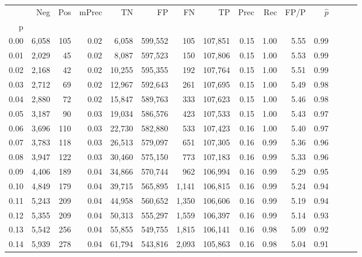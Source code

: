 \begin{tabular}{rrrrrrrrrrrrrrr}
\toprule
{} &     Neg &    Pos & mPrec &       TN &       FP &       FN &       TP &  Prec &   Rec &  FP/P & $\hat{p}$ \\
p    &         &        &       &          &          &          &          &       &       &       &           \\
\midrule
0.00 &   6,058 &    105 &  0.02 &    6,058 &  599,552 &      105 &  107,851 &  0.15 &  1.00 &  5.55 &      0.99 \\
0.01 &   2,029 &     45 &  0.02 &    8,087 &  597,523 &      150 &  107,806 &  0.15 &  1.00 &  5.53 &      0.99 \\
0.02 &   2,168 &     42 &  0.02 &   10,255 &  595,355 &      192 &  107,764 &  0.15 &  1.00 &  5.51 &      0.99 \\
0.03 &   2,712 &     69 &  0.02 &   12,967 &  592,643 &      261 &  107,695 &  0.15 &  1.00 &  5.49 &      0.98 \\
0.04 &   2,880 &     72 &  0.02 &   15,847 &  589,763 &      333 &  107,623 &  0.15 &  1.00 &  5.46 &      0.98 \\
0.05 &   3,187 &     90 &  0.03 &   19,034 &  586,576 &      423 &  107,533 &  0.15 &  1.00 &  5.43 &      0.97 \\
0.06 &   3,696 &    110 &  0.03 &   22,730 &  582,880 &      533 &  107,423 &  0.16 &  1.00 &  5.40 &      0.97 \\
0.07 &   3,783 &    118 &  0.03 &   26,513 &  579,097 &      651 &  107,305 &  0.16 &  0.99 &  5.36 &      0.96 \\
0.08 &   3,947 &    122 &  0.03 &   30,460 &  575,150 &      773 &  107,183 &  0.16 &  0.99 &  5.33 &      0.96 \\
0.09 &   4,406 &    189 &  0.04 &   34,866 &  570,744 &      962 &  106,994 &  0.16 &  0.99 &  5.29 &      0.95 \\
0.10 &   4,849 &    179 &  0.04 &   39,715 &  565,895 &    1,141 &  106,815 &  0.16 &  0.99 &  5.24 &      0.94 \\
0.11 &   5,243 &    209 &  0.04 &   44,958 &  560,652 &    1,350 &  106,606 &  0.16 &  0.99 &  5.19 &      0.94 \\
0.12 &   5,355 &    209 &  0.04 &   50,313 &  555,297 &    1,559 &  106,397 &  0.16 &  0.99 &  5.14 &      0.93 \\
0.13 &   5,542 &    256 &  0.04 &   55,855 &  549,755 &    1,815 &  106,141 &  0.16 &  0.98 &  5.09 &      0.92 \\
0.14 &   5,939 &    278 &  0.04 &   61,794 &  543,816 &    2,093 &  105,863 &  0.16 &  0.98 &  5.04 &      0.91 \\

\end{tabular}
